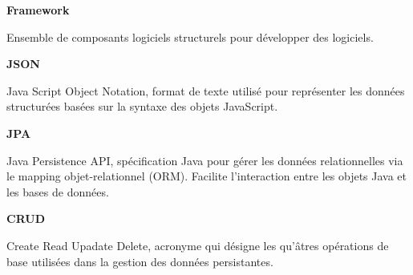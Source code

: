 \vspace{1cm}

\begin{minipage}{\textwidth}
    \begin{minipage}{0.1\textwidth}
        \textbf{Framework}
    \end{minipage}\hfill
    \begin{minipage}{0.8\textwidth}
        Ensemble de composants logiciels structurels pour développer des logiciels. 
    \end{minipage}
\end{minipage}

\vspace{1cm}

\begin{minipage}{\textwidth}
    \begin{minipage}{0.1\textwidth}
        \textbf{JSON}
    \end{minipage}\hfill
    \begin{minipage}{0.8\textwidth}
        Java Script Object Notation, format de texte utilisé pour représenter les données structurées basées sur la syntaxe des objets JavaScript.
    \end{minipage}
\end{minipage}

\vspace{1cm}

\begin{minipage}{\textwidth}
    \begin{minipage}{0.1\textwidth}
        \textbf{JPA}
    \end{minipage}\hfill
    \begin{minipage}{0.8\textwidth}
        Java Persistence API, spécification Java pour gérer les données relationnelles via le mapping objet-relationnel (ORM). Facilite l’interaction entre les objets Java et les bases de données.
    \end{minipage}
\end{minipage}

\vspace{1cm}

\begin{minipage}{\textwidth}
    \begin{minipage}{0.1\textwidth}
        \textbf{CRUD}
    \end{minipage}\hfill
    \begin{minipage}{0.8\textwidth}
        Create Read Upadate Delete, acronyme qui désigne les qu’âtres opérations de base utilisées dans la gestion des données persistantes.    
    \end{minipage}
\end{minipage}

